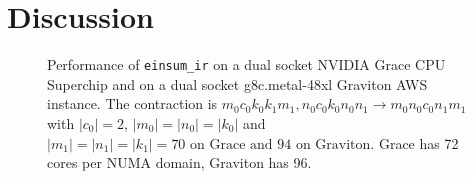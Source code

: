 \section{Discussion}

\begin{figure}[ht]
  \caption{
    Performance of \texttt{einsum\_ir} on a dual socket NVIDIA Grace CPU Superchip and on a dual socket g8c.metal-48xl Graviton AWS instance.
    The contraction is $m_0c_0k_0k_1m_1, n_0c_0k_0n_0n_1 \rightarrow m_0n_0c_0n_1m_1$ with $|c_0|=2$, $|m_0|=|n_0|=|k_0|$ and $|m_1|=|n_1|=|k_1|=70\text{ on Grace and } 94\text{ on Graviton}$.
    Grace has 72 cores per NUMA domain, Graviton has 96.
    }
  \label{c_perf}
\end{figure}
